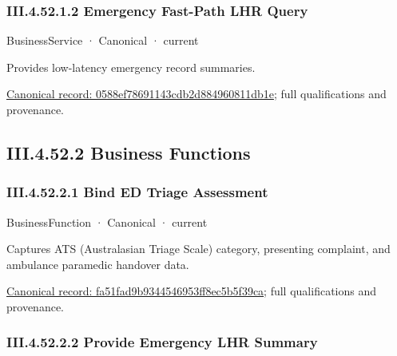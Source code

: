 \subsubsection*{III.4.52.1.2 Emergency Fast-Path LHR Query}
\label{navigation:III.4.52.1.2}

\label{element:0588ef78691143cdb2d884960811db1e}
{\small BusinessService · Canonical · current}\par

Provides low-latency emergency record summaries.


{\footnotesize \href{../../../../continuum/business/business-service/0588ef78691143cdb2d884960811db1e.md}{Canonical record: 0588ef78691143cdb2d884960811db1e}; full qualifications and provenance.}\par
\subsection*{III.4.52.2 Business Functions}
\label{navigation:III.4.52.2}

\subsubsection*{III.4.52.2.1 Bind ED Triage Assessment}
\label{navigation:III.4.52.2.1}

\label{element:fa51fad9b9344546953ff8ec5b5f39ca}
{\small BusinessFunction · Canonical · current}\par

Captures ATS (Australasian Triage Scale) category, presenting complaint, and ambulance paramedic handover data.


{\footnotesize \href{../../../../continuum/business/business-function/fa51fad9b9344546953ff8ec5b5f39ca.md}{Canonical record: fa51fad9b9344546953ff8ec5b5f39ca}; full qualifications and provenance.}\par
\subsubsection*{III.4.52.2.2 Provide Emergency LHR Summary}
\label{navigation:III.4.52.2.2}


